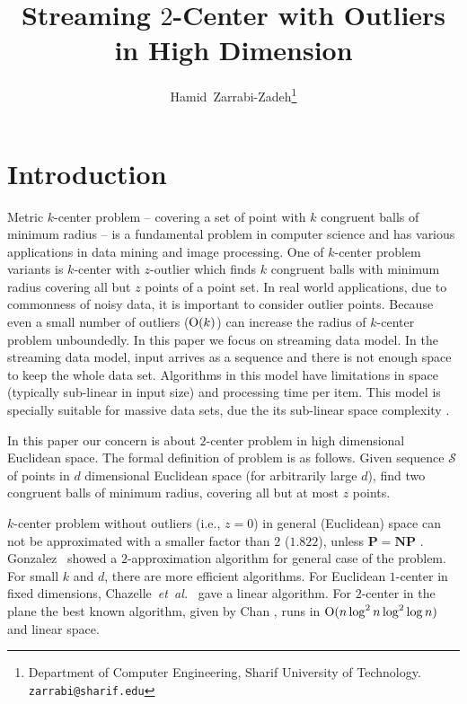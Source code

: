 \documentclass[envcountsame]{cls/cccg15}
\title{Streaming $2$-Center with Outliers in High Dimension}
\author{Hamid~Zarrabi-Zadeh\thanks{Department of Computer Engineering, 
	Sharif University of Technology.
	{\tt zarrabi@sharif.edu}}
	\and 
}
\newcommand{\cO}{\ensuremath{{\rm O}}}
\newcommand{\etal}{{\em et~al.\/}}
\begin{document}
\maketitle
\pagestyle{plain}


\begin{abstract}

\end{abstract}


\section{Introduction}
Metric $k$-center problem -- covering a set of point with $k$ congruent balls of minimum radius -- is a fundamental problem in computer science and has various applications in data mining and image processing.
One of $k$\nobreakdash-center problem variants is $k$-center with $z$-outlier which finds $k$ congruent balls with minimum radius covering all but $z$ points of a point set. In real world applications, due to commonness of noisy data, it is important to consider outlier points. Because even a small number of outliers ($\cO(k)$) can increase the radius of $k$\nobreakdash-center problem unboundedly.
In this paper we focus on streaming data model. In the streaming data model, input arrives as a sequence and there is not enough space to keep the whole data set. Algorithms in this model have limitations in space (typically sub-linear in input size) and processing time per item. This model is specially suitable for massive data sets, due the its sub-linear space complexity \cite{aggarwal2007data}.

In this paper our concern is about $2$-center problem in high dimensional Euclidean space.
The formal definition of problem is as follows. Given sequence $\mathcal{S}$ of points in $d$ dimensional Euclidean space (for arbitrarily large $d$), find two congruent balls of minimum radius, covering all but at most $z$ points.

$k$-center problem without outliers (i.e., $z=0$) in general (Euclidean) space can not be approximated with a smaller factor than $2$ ($1.822$), unless $\mathbf{P}=\mathbf{NP}$ \cite{bern1996approximation}.
Gonzalez~\cite{gonzalez1985clustering} showed a $2$-approximation algorithm for general case of the problem.
For small $k$ and $d$, there are more efficient algorithms.
For Euclidean $1$-center in fixed dimensions, Chazelle~\etal~\cite{chazelle1996linear} gave a linear algorithm.
For $2$\nobreakdash-center in the plane the best known algorithm, given by Chan \cite{chan1999more}, runs in $\cO(n \log^2 n \log^2 \log n)$ and linear space.
\end{document}
